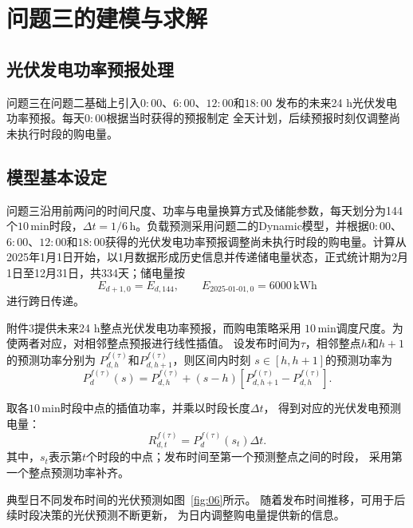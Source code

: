 

\section{问题三的建模与求解}

\subsection{光伏发电功率预报处理}

问题三在问题二基础上引入$0{:}00$、$6{:}00$、$12{:}00$和$18{:}00$
发布的未来24 h光伏发电功率预报。每天$0{:}00$根据当时获得的预报制定
全天计划，后续预报时刻仅调整尚未执行时段的购电量。\subsection{模型基本设定}

问题三沿用前两问的时间尺度、功率与电量换算方式及储能参数，每天划分为144个$10\,\mathrm{min}$时段，$\Delta t=1/6\,\mathrm{h}$。负载预测采用问题二的Dynamic模型，并根据$0{:}00$、$6{:}00$、$12{:}00$和$18{:}00$获得的光伏发电功率预报调整尚未执行时段的购电量。计算从2025年1月1日开始，以1月数据形成历史信息并传递储电量状态，正式统计期为2月1日至12月31日，共334天；储电量按
\begin{equation}
E_{d+1,0}=E_{d,144},\qquad E_{2025\text{-}01\text{-}01,0}=6000\,\mathrm{kWh}
\end{equation}
进行跨日传递。





附件3提供未来24 h整点光伏发电功率预报，而购电策略采用
$10\,\mathrm{min}$调度尺度。为使两者对应，对相邻整点预报进行线性插值。
设发布时间为$\tau$，相邻整点$h$和$h+1$的预测功率分别为
$P_{d,h}^{f(\tau)}$和$P_{d,h+1}^{f(\tau)}$，则区间内时刻
$s\in[h,h+1]$的预测功率为
\begin{equation}
P_{d}^{f(\tau)}(s)
=
P_{d,h}^{f(\tau)}
+
(s-h)
\left[
P_{d,h+1}^{f(\tau)}
-
P_{d,h}^{f(\tau)}
\right].
\label{eq:p3_pv_interp}
\end{equation}

取各$10\,\mathrm{min}$时段中点的插值功率，并乘以时段长度$\Delta t$，
得到对应的光伏发电预测电量：
\begin{equation}
R_{d,t}^{f(\tau)}
=
P_{d}^{f(\tau)}(s_t)\Delta t.
\label{eq:p3_pv_energy}
\end{equation}
其中，$s_t$表示第$t$个时段的中点；发布时间至第一个预测整点之间的时段，
采用第一个整点预测功率补齐。

典型日不同发布时间的光伏预测如图~\ref{fig:06}所示。
随着发布时间推移，可用于后续时段决策的光伏预测不断更新，
为日内调整购电量提供新的信息。

